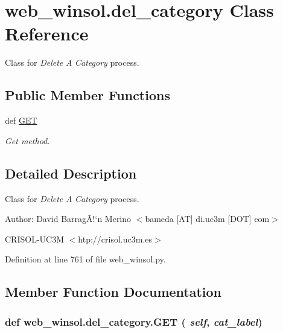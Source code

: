 \hypertarget{classweb__winsol_1_1del__category}{
\section{web\_\-winsol.del\_\-category Class Reference}
\label{classweb__winsol_1_1del__category}
}
Class for {\em Delete\/} {\em A\/} {\em Category\/} process.  


\subsection*{Public Member Functions}
\begin{CompactItemize}
\item 
def \hyperlink{classweb__winsol_1_1del__category_a735e2274d4f529a166b6b4a276ed3e5}{GET}
\begin{CompactList}\small\item\em Get method. \item\end{CompactList}\end{CompactItemize}


\subsection{Detailed Description}
Class for {\em Delete\/} {\em A\/} {\em Category\/} process. 

\begin{Desc}
\item[Author:]David Barrag\~{A}!`n Merino $<$bameda \mbox{[}AT\mbox{]} di.uc3m \mbox{[}DOT\mbox{]} com$>$ 

CRISOL-UC3M $<$htp://crisol.uc3m.es$>$ \end{Desc}




Definition at line 761 of file web\_\-winsol.py.

\subsection{Member Function Documentation}
\hypertarget{classweb__winsol_1_1del__category_a735e2274d4f529a166b6b4a276ed3e5}{
\subsubsection[GET]{\setlength{\rightskip}{0pt plus 5cm}def web\_\-winsol.del\_\-category.GET ( {\em self},  {\em cat\_\-label})}}
\label{classweb__winsol_1_1del__category_a735e2274d4f529a166b6b4a276ed3e5}


